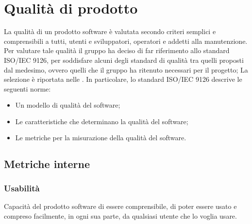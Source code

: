 \section{Qualità di prodotto}
La qualità di un prodotto software è valutata secondo criteri semplici e comprensibili a tutti, utenti e sviluppatori, operatori e addetti alla manutenzione.
Per valutare tale qualità il gruppo \Gruppo{} ha deciso di far riferimento allo standard ISO/IEC 9126, per soddisfare alcuni degli standard di qualità tra quelli proposti dal medesimo, ovvero quelli che il gruppo ha ritenuto necessari per il progetto; La selezione è riportata nelle \NdP{}. In particolare, lo standard ISO/IEC 9126 descrive le seguenti norme:
\begin{itemize}
    \item Un modello di qualità del software; 
    \item Le caratteristiche che determinano la qualità del software;
    \item Le metriche per la misurazione della qualità del software.
\end{itemize}

\subsection{Metriche interne}

\subsubsection{Usabilità} 
Capacità del prodotto software di essere comprensibile, di poter essere usato e compreso facilmente, in ogni sua parte, da qualsiasi utente che lo voglia usare.\\

